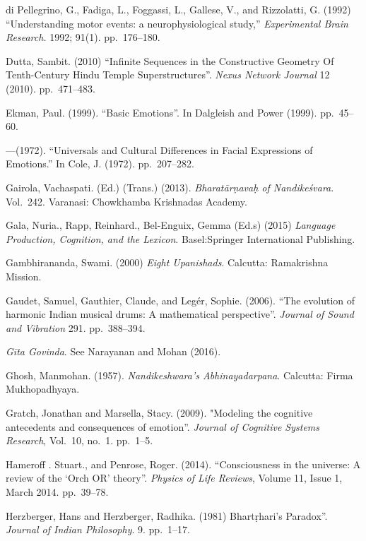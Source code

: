 \begin{thebibliography}{99}
di Pellegrino, G., Fadiga, L., Foggassi, L., Gallese, V., and Rizzolatti, G. (1992) “Understanding motor events: a neurophysiological study,” \textsl{Experimental Brain Research.} 1992; 91(1). pp.~176--180.

Dutta, Sambit. (2010) “Infinite Sequences in the Constructive Geometry Of Tenth-Century Hindu Temple  Superstructures”. \textsl{Nexus Network Journal} 12 (2010). pp.~471--483.

Ekman, Paul. (1999). ``Basic Emotions''. In Dalgleish and Power (1999). pp.~45--60.

---\kern3pt(1972). ``Universals and Cultural Differences in Facial Expressions of Emotions.'' In Cole, J. (1972). pp.~207--282.

Gairola, Vachaspati. (Ed.) (Trans.) (2013). \textsl{Bharatārṇavaḥ of Nandikeśvara}. Vol.~242. Varanasi: Chowkhamba Krishnadas Academy.

Gala, Nuria., Rapp, Reinhard., Bel-Enguix, Gemma (Ed.s) (2015) \textsl{Language Production, Cognition, and the Lexicon}. Basel:Springer International Publishing.

Gambhirananda, Swami. (2000) \textsl{Eight Upanishads}. Calcutta: Ramakrishna Mission.

Gaudet, Samuel, Gauthier, Claude, and Legér, Sophie. (2006). “The evolution of harmonic Indian musical drums: A mathematical perspective”. \textsl{Journal of Sound and Vibration} 291. pp.~388--394.

\textsl{Gīta Govinda}. See Narayanan and Mohan (2016).

Ghosh, Manmohan. (1957). \textsl{Nandikeshwara’s Abhinayadarpana}. Calcutta: Firma Mukhopadhyaya.

Gratch, Jonathan and Marsella, Stacy. (2009). "Modeling the cognitive antecedents and consequences of emotion”. \textsl{Journal of Cognitive Systems Research}, Vol.~10, no.~1. pp.~1--5.

Hameroff . Stuart., and Penrose, Roger. (2014). “Consciousness in the universe: A review of the ‘Orch OR’ theory”. \textsl{Physics of Life Reviews}, Volume 11, Issue 1, March 2014. pp.~39--78.

Herzberger, Hans and Herzberger, Radhika. (1981) Bhartṛhari's Paradox”. \textsl{Journal of Indian Philosophy}. 9. pp.~1--17.


\end{thebibliography}
